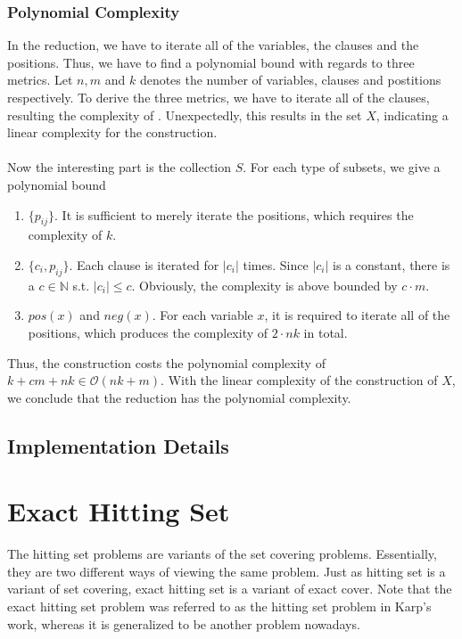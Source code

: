 \subsubsection{Polynomial Complexity}
In the reduction, we have to iterate all of the variables, the clauses and the positions. 
Thus, we have to find a polynomial bound with regards to three metrics. Let $n, m$ and $k$ denotes 
the number of variables, clauses and postitions respectively. To derive the three metrics, we have to iterate 
all of the clauses, resulting the complexity of . Unexpectedly, this results in the set $X$, 
indicating a linear complexity for the construction. \\\\
Now the interesting part is the collection $S$. For each type of subsets, we give a polynomial bound 
\begin{enumerate}
    \item $\{p_{ij}\}$. It is sufficient to merely iterate the positions, which requires the complexity of $k$.
    \item $\{c_i, p_{ij}\}$. Each clause is iterated for $|c_i|$ times. Since $|c_i|$ is a constant, there is a $c \in \mathbb{N}$ 
    s.t. $|c_i| \leq c$. Obviously, the complexity is above bounded by $c \cdot m$.
    \item $pos(x)$ and $neg(x)$. For each variable $x$, it is required to iterate all of the positions, which produces the complexity 
    of $2 \cdot nk$ in total.
\end{enumerate}
Thus, the construction costs the polynomial complexity of $k + cm + nk \in \mathcal{O}(nk + m)$. 
With the linear complexity of the construction of $X$, we conclude that the reduction has the polynomial complexity.

\subsection{Implementation Details}


\section{Exact Hitting Set}
The hitting set problems are variants of the set covering problems. Essentially, they are two different ways 
of viewing the same problem. Just as hitting set is a variant of set covering, exact hitting set is 
a variant of exact cover. 
Note that the exact hitting set problem was referred to as the hitting set problem in Karp's work, whereas 
it is generalized to be another problem nowadays. 

